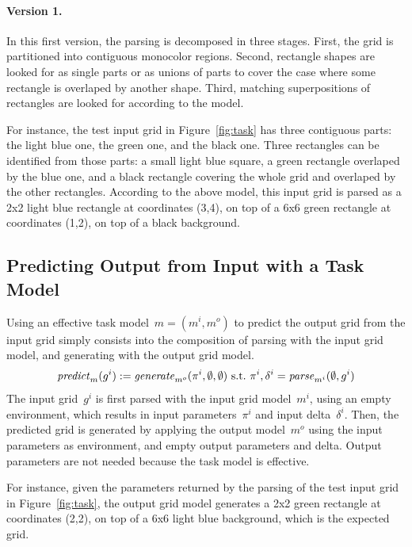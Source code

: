 \documentclass[a4paper]{llncs}
\begin{document}
\paragraph{Version 1.} In this first version, the parsing is
decomposed in three stages. First, the grid is partitioned into
contiguous monocolor regions. Second, rectangle shapes are looked for
as single parts or as unions of parts to cover the case where some
rectangle is overlaped by another shape. Third, matching
superpositions of rectangles are looked for according to the model.

For instance, the test input grid in Figure~\ref{fig:task} has three
contiguous parts: the light blue one, the green one, and the black
one. Three rectangles can be identified from those parts: a small
light blue square, a green rectangle overlaped by the blue one, and a
black rectangle covering the whole grid and overlaped by the other
rectangles. According to the above model, this input grid is parsed as
a 2x2 light blue rectangle at coordinates (3,4), on top of a 6x6 green
rectangle at coordinates (1,2), on top of a black background.

\subsection{Predicting Output from Input with a Task Model}
\label{predicting}


Using an effective task model~$m = (m^i,m^o)$ to predict the output
grid from the input grid simply consists into the composition of
parsing with the input grid model, and generating with the output grid
model.
\[ {\it predict}_m(g^i) := {\it
    generate}_{m^o}(\pi^i,\emptyset,\emptyset) \textrm{~s.t.~} \pi^i,
  \delta^i = {\it parse}_{m^i}(\emptyset, g^i) \] 
%
The input grid~$g^i$ is first parsed with the input grid model~$m^i$,
using an empty environment, which results in input parameters~$\pi^i$
and input delta~$\delta^i$. Then, the predicted grid is generated by
applying the output model~$m^o$ using the input parameters as
environment, and empty output parameters and delta. Output parameters
are not needed because the task model is effective.

For instance, given the parameters returned by the parsing of the test
input grid in Figure~\ref{fig:task}, the output grid model generates a
2x2 green rectangle at coordinates (2,2), on top of a 6x6 light blue
background, which is the expected grid.
\end{document}
